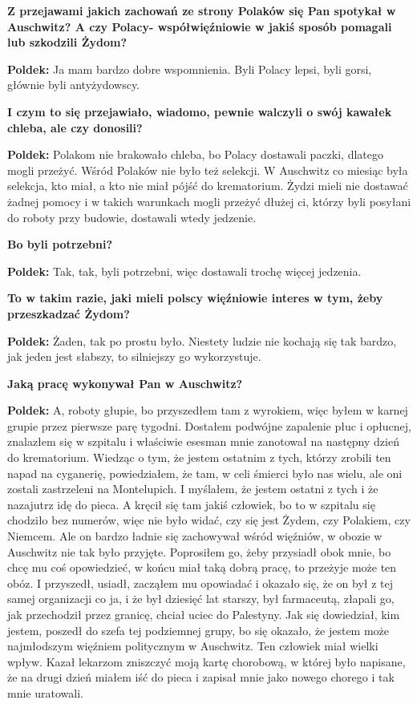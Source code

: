 \begin{otherlanguage}{polish}
\textbf{Z przejawami jakich zachowań ze strony Polaków się Pan spotykał w Auschwitz? A czy Polacy- współwięźniowie w jakiś sposób pomagali lub szkodzili Żydom?}

\textbf{Poldek:} Ja mam bardzo dobre wspomnienia. Byli Polacy lepsi, byli gorsi, głównie byli antyżydowscy.

\textbf{I czym to się przejawiało, wiadomo, pewnie walczyli o swój kawałek chleba, ale czy donosili?}
  
\textbf{Poldek:} Polakom nie brakowało chleba, bo Polacy dostawali paczki, dlatego mogli przeżyć. Wśród Polaków nie było też selekcji. W Auschwitz co miesiąc była selekcja, kto miał, a kto nie miał pójść do krematorium. Żydzi mieli nie dostawać żadnej pomocy i w takich warunkach mogli przeżyć dłużej ci, którzy byli posyłani do roboty przy budowie, dostawali wtedy jedzenie.

\textbf{Bo byli potrzebni?}

\textbf{Poldek:} Tak, tak, byli potrzebni, więc dostawali trochę więcej jedzenia. 

\textbf{To w takim razie, jaki mieli polscy więźniowie interes w tym, żeby przeszkadzać Żydom?}

\textbf{Poldek:} Żaden, tak po prostu było. Niestety ludzie nie kochają się tak bardzo, jak jeden jest słabszy, to silniejszy go wykorzystuje.

\textbf{Jaką pracę wykonywał Pan w Auschwitz?}
 
\textbf{Poldek:} A, roboty głupie, bo przyszedłem tam z wyrokiem, więc byłem w karnej grupie przez pierwsze parę tygodni. Dostałem podwójne zapalenie płuc i opłucnej, znalazłem się w szpitalu i właściwie esesman mnie zanotował na następny dzień do krematorium. Wiedząc o tym, że jestem ostatnim z tych, którzy zrobili ten napad na cyganerię, powiedziałem, że tam, w celi śmierci było nas wielu, ale oni zostali zastrzeleni na Montelupich. I myślałem, że jestem ostatni z tych i że nazajutrz idę do pieca. A kręcił się tam jakiś człowiek, bo to w szpitalu się chodziło bez numerów, więc nie było widać, czy się jest Żydem, czy Polakiem, czy Niemcem. Ale on bardzo ładnie się zachowywał wśród więźniów, w obozie w Auschwitz nie tak było przyjęte. Poprosiłem go, żeby przysiadł obok mnie, bo chcę mu coś opowiedzieć, w końcu miał taką dobrą pracę, to przeżyje może ten obóz. I przyszedł, usiadł, zacząłem mu opowiadać i okazało się, że on był z tej samej organizacji co ja, i że był dziesięć lat starszy, był farmaceutą, złapali go, jak przechodził przez granicę, chciał uciec do Palestyny. Jak się dowiedział, kim jestem, poszedł do szefa tej podziemnej grupy, bo się okazało, że jestem może najmłodszym więźniem politycznym w Auschwitz. Ten człowiek miał wielki wpływ. Kazał lekarzom zniszczyć moją kartę chorobową, w której było napisane, że na drugi dzień miałem iść do pieca i zapisał mnie jako nowego chorego i tak mnie uratowali. 
  

\end{otherlanguage}
